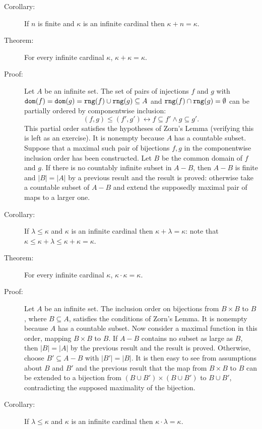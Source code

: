 \documentclass[12pt]{book}
\begin{document}
\begin{description}
\item[Corollary:] If $n$ is finite and $\kappa$ is an infinite
cardinal then $\kappa+n = \kappa$.

\item[Theorem:] For every infinite cardinal $\kappa$,
$\kappa+\kappa=\kappa$.

\item[Proof:] Let $A$ be an infinite set.  The set of
pairs of injections $f$ and $g$ with ${\tt dom}(f)={\tt dom}(g) = {\tt rng}(f) \cup {\tt rng}(g) \subseteq A$ and
${\tt rng}(f) \cap {\tt rng}(g) = \emptyset$ can be partially ordered by componentwise
inclusion: $$(f,g) \leq (f',g') \leftrightarrow f\subseteq f' \wedge g \subseteq g'.$$  This partial order satisfies the hypotheses of Zorn's Lemma (verifying this is left as an exercise).  It is nonempty
because $A$ has a countable subset. Suppose that a maximal such pair
of bijections $f,g$ in the componentwise inclusion order has been constructed. Let $B$ be the common domain of $f$ and $g$. If there is no countably infinite
subset in $A-B$, then $A-B$ is finite and $|B|=|A|$ by a previous
result and the result is proved: otherwise take a countable
subset of $A-B$ and extend the supposedly maximal pair of  maps to a larger one.

\item[Corollary:]  If $\lambda\leq \kappa$ and $\kappa$ is an infinite cardinal
then $\kappa+\lambda=\kappa$:  note that $\kappa \leq \kappa+\lambda \leq \kappa+\kappa=\kappa$.

\item[Theorem:] For every infinite cardinal $\kappa$,
$\kappa\cdot\kappa = \kappa$.

\item[Proof:] Let $A$ be an infinite set.  The inclusion order on
bijections from $B\times B$ to $B$, where $B \subseteq A$, satisfies
the conditions of Zorn's Lemma.  It is nonempty because $A$ has a
countable subset.  Now consider a maximal function in this order,
mapping $B \times B$ to $B$.  If $A-B$ contains no subset as large as
$B$, then $|B| = |A|$ by the previous result and the result is proved.
Otherwise, choose $B' \subseteq A-B$ with $|B'| = |B|$.  It is then
easy to see from assumptions about $B$ and $B'$ and the previous
result that the map from $B \times B$ to $B$ can be extended to a
bijection from $(B \cup B') \times (B \cup B')$ to $B \cup B'$,
contradicting the supposed maximality of the bijection.

\item[Corollary:]  If $\lambda\leq \kappa$ and $\kappa$ is an infinite cardinal
then $\kappa\cdot\lambda=\kappa$.



\end{description}
\end{document}
